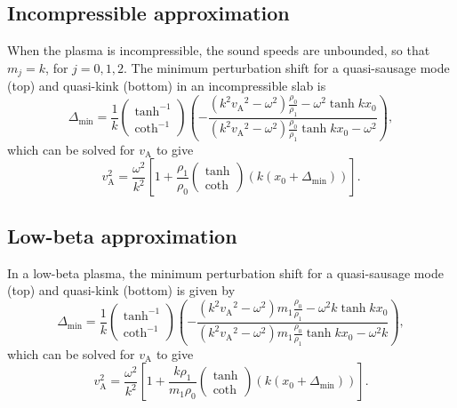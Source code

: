\documentclass[12pt]{../style-files/ociamthesis}
\begin{document}
\subsection{Incompressible approximation} \label{sec: mps incomp}
When the plasma is incompressible, the sound speeds are unbounded, so that $m_j = k$, for $j = 0, 1, 2$. The minimum perturbation shift for a quasi-sausage mode (top) and quasi-kink (bottom) in an incompressible slab is
\begin{equation}
\Delta_\textrm{min} = \frac{1}{k}\left(\begin{matrix} \tanh^{-1} \\ \coth^{-1} \end{matrix}\right)\left(-\frac{(k^2{v_\textrm{A}}^2-\omega^2)\frac{\rho_0}{\rho_1} - \omega^2\tanh{kx_0}}{(k^2{v_\textrm{A}}^2-\omega^2)\frac{\rho_0}{\rho_1}\tanh{kx_0} - \omega^2}\right),
\end{equation}
which can be solved for $v_\textrm{A}$ to give
\begin{equation}
v_\textrm{A}^2 = \frac{\omega^2}{k^2}\left[1 + \frac{\rho_1}{\rho_0}\left(\begin{matrix} \tanh \\ \coth \end{matrix}\right)(k(x_0 + \Delta_\textrm{min}))\right].
\end{equation}


\subsection{Low-beta approximation} \label{sec: mps low-beta}
In a low-beta plasma, the minimum perturbation shift for a quasi-sausage mode (top) and quasi-kink (bottom) is given by
\begin{equation}
\Delta_\textrm{min} = \frac{1}{k}\left(\begin{matrix} \tanh^{-1} \\ \coth^{-1} \end{matrix}\right)\left(-\frac{(k^2{v_\textrm{A}}^2 - \omega^2)m_1\frac{\rho_0}{\rho_1} - \omega^2k\tanh{kx_0}}{(k^2{v_\textrm{A}}^2 - \omega^2)m_1\frac{\rho_0}{\rho_1}\tanh{kx_0} - \omega^2k}\right),
\end{equation}
which can be solved for $v_\textrm{A}$ to give
\begin{equation}
v_\textrm{A}^2 = \frac{\omega^2}{k^2}\left[1 + \frac{k\rho_1}{m_1\rho_0}\left(\begin{matrix} \tanh \\ \coth \end{matrix}\right)(k(x_0 + \Delta_\textrm{min}))\right].
\end{equation}
\end{document}
